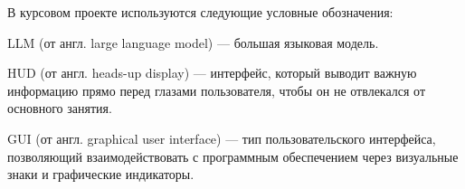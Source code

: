 \label{sec:reduction}
В курсовом проекте используются следующие условные обозначения:

LLM (от англ. large language model) ---  большая языковая модель.

HUD (от англ. heads-up display) ---  интерфейс, который выводит важную информацию прямо перед глазами пользователя, чтобы он не отвлекался от основного занятия.

GUI (от англ. graphical user interface) ---  тип пользовательского интерфейса, позволяющий взаимодействовать с программным обеспечением через визуальные знаки и графические индикаторы.

